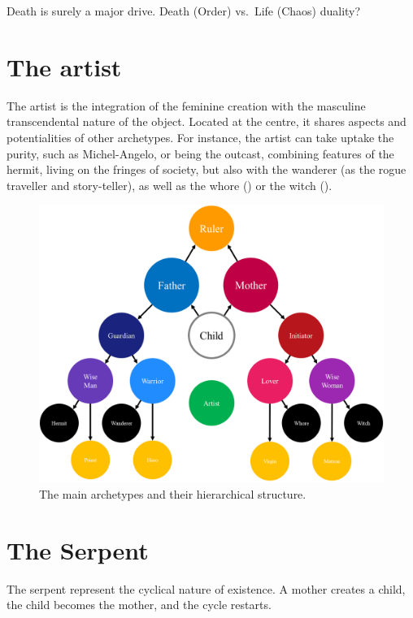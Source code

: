 \documentclass[
]{book}
\begin{document}
Death is surely a major drive. Death (Order) vs.~Life (Chaos) duality?

\hypertarget{the-artist}{%
\section{The artist}\label{the-artist}}

The artist is the integration of the feminine creation with the masculine transcendental nature of the object. Located at the centre, it shares aspects and potentialities of other archetypes. For instance, the artist can take uptake the purity, such as Michel-Angelo, or being the outcast, combining features of the hermit, living on the fringes of society, but also with the wanderer (as the rogue traveller and story-teller), as well as the whore () or the witch ().

\begin{figure}

{\centering \includegraphics[width=\textwidth]{img/archetypes} 

}

\caption{The main archetypes and their hierarchical structure.}\label{fig:unnamed-chunk-15}
\end{figure}

\hypertarget{the-serpent}{%
\section{The Serpent}\label{the-serpent}}

The serpent represent the cyclical nature of existence. A mother creates a child, the child becomes the mother, and the cycle restarts.
\end{document}
